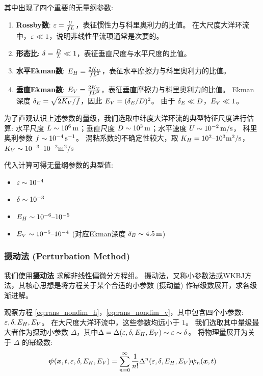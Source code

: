 其中出现了四个重要的无量纲参数:
\begin{enumerate}
    \item \textbf{Rossby数}: $\varepsilon = \frac{U}{f L}$，表征惯性力与科里奥利力的比值。
    在大尺度大洋环流中，$\varepsilon \ll 1$，说明非线性平流项通常是次要的。

    \item \textbf{形态比}: $\delta = \frac{D}{L} \ll 1$，表征垂直尺度与水平尺度的比值。

    \item \textbf{水平Ekman数}: $E_H = \frac{2K_H}{f L^2}$，表征水平摩擦力与科里奥利力的比值。

    \item \textbf{垂直Ekman数}: $E_V = \frac{2K_V}{f D^2}$，表征垂直摩擦力与科里奥利力的比值。
    Ekman深度 $\delta_E = \sqrt{2K_V/f}$，因此 $E_V = (\delta_E / D)^2$。
    由于 $\delta_E \ll D$，$E_V \ll 1$。
\end{enumerate}

为了直观认识上述参数的量级，我们选取中纬度大洋环流的典型特征尺度进行估算:
水平尺度 $L \sim 10^6\,\mathrm{m}$；垂直尺度 $D \sim 10^3\,\mathrm{m}$；水平速度 $U \sim 10^{-2}\,\mathrm{m/s}$，
科里奥利参数 $f \sim 10^{-4}\,\mathrm{s^{-1}}$。
涡粘系数的不确定性较大，取 $K_H = 10^2 \text{--} 10^3 \mathrm{m^2/s}$，$K_V \sim 10^{-3} \text{--} 10^{-2} \mathrm{m^2/s}$

代入计算可得无量纲参数的典型值:
\begin{itemize}
    \item $\varepsilon \sim 10^{-4}$
    \item $\delta \sim 10^{-3}$
    \item $E_H \sim 10^{-6} \text{--} 10^{-5}$
    \item $E_V \sim 10^{-5} \text{--} 10^{-4}$ (对应Ekman深度 $\delta_E \sim 4.5\,\mathrm{m}$)
\end{itemize}

\subsubsection{摄动法 (Perturbation Method)}

我们使用\textbf{摄动法} 求解非线性偏微分方程组。
摄动法，又称小参数法或WKBJ方法，其核心思想是将方程关于某个合适的小参数 (摄动量) 作幂级数展开，求各级渐进解。

观察方程 \eqref{eq:rans_nondim_h}，\eqref{eq:rans_nondim_v}，其中包含四个小参数: $\varepsilon, \delta, E_H, E_V$。
在大尺度大洋环流中，这些参数均远小于 $1$。
我们选取其中量级最大者作为摄动小参数 $\Delta$，其中$\Delta = \Delta(\varepsilon, \delta, E_H, E_V) \sim \varepsilon \sim \delta$。
将物理量展开为关于 $\Delta$ 的幂级数:
\begin{equation}
    \bm{\psi}(\bm{x}, t, \varepsilon, \delta, E_H, E_V) = \sum_{n=0}^{\infty} \frac{1}{n!} \Delta^n(\varepsilon, \delta, E_H, E_V) \bm{\psi}_n(\bm{x}, t)
    \label{eq:perturbation_expansion}
\end{equation}

